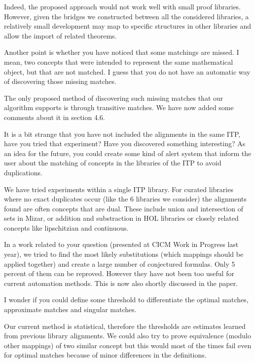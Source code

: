 \documentclass[]{scrartcl}
\begin{document}
Indeed, the proposed approach would not work well with small proof libraries.
However, given the bridges we constructed between all the considered libraries, 
a relatively small development may
map to specific structures in other libraries and allow the import of related 
theorems.

\begin{leftbar}Another point is whether you have noticed that some matchings 
are missed.
I mean, two concepts that were intended to represent the same mathematical 
object, but that are not matched. I guess that you do not have an automatic way 
of discovering those missing matches.
\end{leftbar}

The only proposed method of discovering such missing matches that our algorithm 
supports is through transitive matches.
We have now added some comments about it in section 4.6.

\begin{leftbar}It is a bit strange that you have not included the alignments in 
the same ITP, have you tried that experiment? Have you discovered something 
interesting? As an idea for the future, you could create some kind of alert 
system that inform the user about the matching of concepts in the libraries of 
the ITP to avoid duplications.
\end{leftbar}

We have tried experiments within a single ITP library. For curated libraries 
where no exact duplicates
occur (like the 6 libraries we consider) the alignments found are often 
concepts that are dual. These
include union and intersection of sets in Mizar, or addition and substraction 
in HOL libraries or
closely related concepts like lipschitzian and continuous.

In a work related to your question (presented at CICM Work in Progress last 
year), we tried to find the most likely substitutions (which mappings
should be applied together) and create a large number of conjectured formulas. 
Only 5 percent of them can be reproved. However they have not been too useful 
for current automation methods. This is now also shortly discussed in the paper.

\begin{leftbar}I wonder if you could define some threshold to differentiate the 
optimal matches, approximate matches and singular matches.
\end{leftbar}

Our current method is statistical, therefore the thresholds are estimates 
learned from previous library alignments.
We could also try to prove equivalence (modulo other mappings) of two similar 
concept but this would most of the times fail even for optimal matches because 
of minor differences in the definitions.
\end{document}
